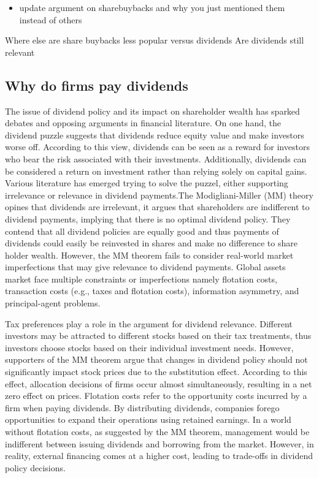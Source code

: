 \documentclass[
]{article}
\providecommand{\tightlist}{%
  \setlength{\itemsep}{0pt}\setlength{\parskip}{0pt}}
\begin{document}
\begin{itemize}
\tightlist
\item
  update argument on sharebuybacks and why you just mentioned them
  instead of others
\end{itemize}

Where else are share buybacks less popular versus dividends Are
dividends still relevant

\hypertarget{why-do-firms-pay-dividends}{%
\subsection{Why do firms pay
dividends}\label{why-do-firms-pay-dividends}}

The issue of dividend policy and its impact on shareholder wealth has
sparked debates and opposing arguments in financial literature. On one
hand, the dividend puzzle suggests that dividends reduce equity value
and make investors worse off. According to this view, dividends can be
seen as a reward for investors who bear the risk associated with their
investments. Additionally, dividends can be considered a return on
investment rather than relying solely on capital gains. Various
literature has emerged trying to solve the puzzel, either supporting
irrelevance or relevance in dividend payments.The Modigliani-Miller (MM)
theory opines that dividends are irrelevant, it argues that shareholders
are indifferent to dividend payments, implying that there is no optimal
dividend policy. They contend that all dividend policies are equally
good and thus payments of dividends could easily be reinvested in shares
and make no difference to share holder wealth. However, the MM theorem
fails to consider real-world market imperfections that may give
relevance to dividend payments. Global assets market face multiple
constraints or imperfections namely flotation costs, transaction costs
(e.g., taxes and flotation costs), information asymmetry, and
principal-agent problems.

Tax preferences play a role in the argument for dividend relevance.
Different investors may be attracted to different stocks based on their
tax treatments, thus investors choose stocks based on their individual
investment needs. However, supporters of the MM theorem argue that
changes in dividend policy should not significantly impact stock prices
due to the substitution effect. According to this effect, allocation
decisions of firms occur almost simultaneously, resulting in a net zero
effect on prices. Flotation costs refer to the opportunity costs
incurred by a firm when paying dividends. By distributing dividends,
companies forego opportunities to expand their operations using retained
earnings. In a world without flotation costs, as suggested by the MM
theorem, management would be indifferent between issuing dividends and
borrowing from the market. However, in reality, external financing comes
at a higher cost, leading to trade-offs in dividend policy decisions.
\end{document}
